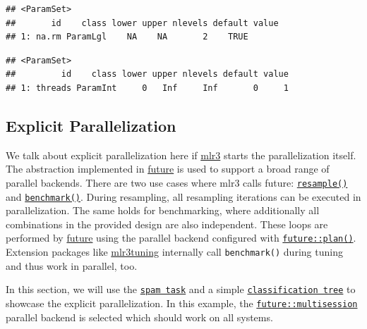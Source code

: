 \documentclass[
]{scrbook}
\newenvironment{Shaded}{\begin{snugshade}}{\end{snugshade}}
\newcommand{\CommentTok}[1]{\textcolor[rgb]{0.56,0.35,0.01}{\textit{#1}}}
\newcommand{\DecValTok}[1]{\textcolor[rgb]{0.00,0.00,0.81}{#1}}
\newcommand{\NormalTok}[1]{#1}
\newcommand{\SpecialCharTok}[1]{\textcolor[rgb]{0.00,0.00,0.00}{#1}}
\renewenvironment{Shaded} {\begin{snugshade}\small} {\end{snugshade}}
\begin{document}
\begin{verbatim}
## <ParamSet>
##       id    class lower upper nlevels default value
## 1: na.rm ParamLgl    NA    NA       2    TRUE
\end{verbatim}

\begin{Shaded}
\end{Shaded}

\begin{verbatim}
## <ParamSet>
##         id    class lower upper nlevels default value
## 1: threads ParamInt     0   Inf     Inf       0     1
\end{verbatim}

\hypertarget{explicit-parallelization}{%
\subsection{Explicit Parallelization}\label{explicit-parallelization}}

We talk about explicit parallelization here if \href{https://mlr3.mlr-org.com}{mlr3} starts the parallelization itself.
The abstraction implemented in \href{https://cran.r-project.org/package=future}{future} is used to support a broad range of parallel backends.
There are two use cases where mlr3 calls future: \href{https://mlr3.mlr-org.com/reference/resample.html}{\texttt{resample()}} and \href{https://mlr3.mlr-org.com/reference/benchmark.html}{\texttt{benchmark()}}.
During resampling, all resampling iterations can be executed in parallelization.
The same holds for benchmarking, where additionally all combinations in the provided design are also independent.
These loops are performed by \href{https://cran.r-project.org/package=future}{future} using the parallel backend configured with \href{https://www.rdocumentation.org/packages/future/topics/plan}{\texttt{future::plan()}}.
Extension packages like \href{https://mlr3tuning.mlr-org.com}{mlr3tuning} internally call \texttt{benchmark()} during tuning and thus work in parallel, too.

In this section, we will use the \href{https://mlr3.mlr-org.com/reference/mlr_tasks_spam.html}{\texttt{spam\ task}} and a simple \href{https://mlr3.mlr-org.com/reference/mlr_learners_classif.rpart.html}{\texttt{classification\ tree}} to showcase the explicit parallelization.
In this example, the \href{https://www.rdocumentation.org/packages/future/topics/multisession}{\texttt{future::multisession}} parallel backend is selected which should work on all systems.
\end{document}
